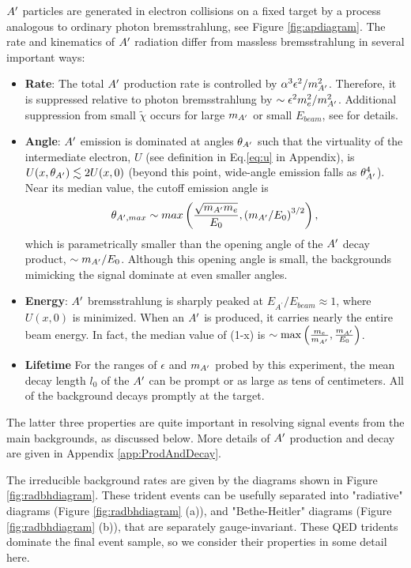 $A^\prime$ particles are generated in electron collisions on a fixed target by a process analogous to ordinary photon bremsstrahlung, see Figure \ref{fig:apdiagram}.  The rate and kinematics of $A^\prime$ radiation differ from massless bremsstrahlung in several important ways:
\begin{itemize}
\item  {\bf Rate}: The total $A^\prime$ production rate is controlled by $\alpha^3\epsilon^2 / m_{A^\prime}^2$.  
 Therefore, it is suppressed relative to photon bremsstrahlung by $\sim \epsilon^2 m_e^2/m_{A^\prime}^2$.  Additional suppression from small $\tilde{\chi}$  occurs for large $m_{A^\prime}$  or small $E_{beam}$, see \cite{Bjorken:2009mm} for details.
\item {\bf Angle}:  $A^\prime$ emission is dominated at angles $\theta_{A^\prime}$ such that the virtuality of the intermediate electron, $U$ (see definition in Eq.\ref{eq:u} in Appendix), is $U(x,\theta_{A^\prime})\lesssim 2 U(x,0)$ (beyond this point, wide-angle emission falls as $\theta_{A^\prime}^4$). Near its median value, the cutoff emission angle is
\begin{equation}
\theta_{A^\prime,max}\sim max\left(\frac{\sqrt{m_{A^\prime} m_e}}{E_0},\left(m_{A^\prime}/E_0\right)^{3/2}\right),
\end{equation}
which is parametrically smaller than the opening angle of the $A^\prime$ decay product, $\sim  m_{A^\prime}/E_0$.  Although this opening angle is small, the backgrounds mimicking the signal dominate at even smaller angles.
\item {\bf Energy}:  $A^\prime$ bremsstrahlung is sharply peaked at $E_{A^\prime}/E_{beam}\approx 1$, where $U(x,0)$ is minimized.  When an $A^\prime$ is produced, it carries nearly the entire beam energy.  In fact, the median value of (1-x) is $\sim {\rm max}\left(\frac{m_e}{m_{A^\prime}},\frac{m_{A^\prime}}{E_0}\right)$.  
\item{\bf Lifetime} For the ranges of $\epsilon$ and $m_{A^\prime}$ probed by this experiment, the mean decay length $l_0$ of the $A^\prime$ can be prompt or as large as tens of centimeters. All of the background decays promptly at the target.  
\end{itemize}
The  latter three properties are quite important in resolving signal events from the main backgrounds, as discussed
below.   More details of $A^\prime$ production and decay are given in Appendix \ref{app:ProdAndDecay}.

The irreducible background rates are given by the diagrams shown in Figure \ref{fig:radbhdiagram}. These trident events can be usefully separated into "radiative" diagrams (Figure \ref{fig:radbhdiagram} (a)), and "Bethe-Heitler" diagrams (Figure \ref{fig:radbhdiagram} (b)), that are separately gauge-invariant.  These QED tridents dominate the final event sample, so we consider their properties in some detail here.

